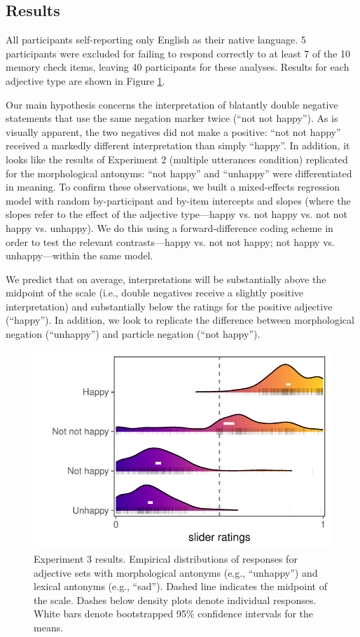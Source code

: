 \documentclass[floatsintext,doc]{apa6}
\begin{document}
\subsection{Results}

All participants self-reporting only English as their native language. 5 participants were excluded for failing to respond correctly to at least 7 of the 10 memory check items, leaving 40 participants for these analyses.
Results for each adjective type are shown in Figure \ref{fig:expt3-results}.

Our main hypothesis concerns the interpretation of blatantly double negative statements that use the same negation marker twice (``not not happy''). 
As is visually apparent, the two negatives did not make a positive: ``not not happy'' received a markedly different interpretation than simply ``happy''.
In addition, it looks like the results of Experiment 2 (multiple utterances condition) replicated for the morphological antonyms: ``not happy'' and ``unhappy'' were differentiated in meaning. 
To confirm these observations, we built a mixed-effects regression model with random by-participant and by-item intercepts and slopes (where the slopes refer to the effect of the adjective type---happy vs. not happy vs. not not happy vs. unhappy). 
We do this using a forward-difference coding scheme in order to test the relevant contrasts---happy vs. not not happy; not happy vs. unhappy---within the same model. 

We predict that on average, interpretations will be substantially above the midpoint of the scale (i.e., double negatives receive a slightly positive interpretation) and substantially below the ratings for the positive adjective (``happy''). In addition, we look to replicate the difference between morphological negation (``unhappy'') and particle negation (``not happy''). 


\begin{figure}[h]
\centering \includegraphics[width=0.95\linewidth]{figs/expt3_ridges_wCIs} 
\caption{Experiment 3 results. Empirical distributions of responses for adjective sets with morphological antonyms (e.g., ``unhappy'') and lexical antonyms (e.g., ``sad''). Dashed line indicates the midpoint of the scale. Dashes below density plots denote individual responses. White bars denote bootstrapped 95\% confidence intervals for the means.}\label{fig:expt3-results}
\end{figure}
\end{document}
